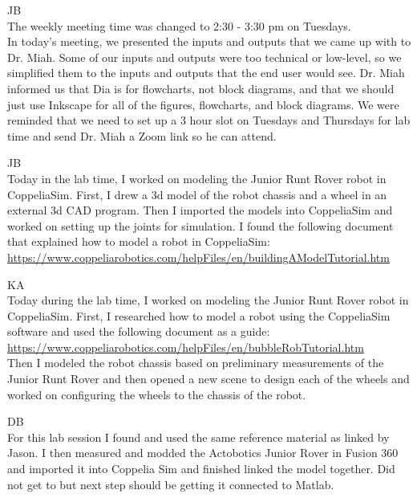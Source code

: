 \documentclass[fontsize=11pt, %
                             paper=letter, %
                             openany, %
                             captions=tableheading,
                             index=totoc,
                             hyperref]{labbook}
\begin{document}
\begin{addmargin}[0cm]{0cm}
JB\\
The weekly meeting time was changed to 2:30 - 3:30 pm on Tuesdays.\\
In today's meeting, we presented the inputs and outputs that we came up with to Dr. Miah. Some of our inputs and outputs were too technical or low-level, so we simplified them to the inputs and outputs that the end user would see. Dr. Miah informed us that Dia is for flowcharts, not block diagrams, and that we should just use Inkscape for all of the figures, flowcharts, and block diagrams. We were reminded that we need to set up a 3 hour slot on Tuesdays and Thursdays for lab time and send Dr. Miah a Zoom link so he can attend.



JB\\
Today in the lab time, I worked on modeling the Junior Runt Rover robot in CoppeliaSim. First, I drew a 3d model of the robot chassis and a wheel in an external 3d CAD program. Then I imported the models into CoppeliaSim and worked on setting up the joints for simulation. I found the following document that explained how to model a robot in CoppeliaSim: \href{https://www.coppeliarobotics.com/helpFiles/en/buildingAModelTutorial.htm}{https://www.coppeliarobotics.com/helpFiles/en/buildingAModelTutorial.htm}

\vspace*{12pt}

KA\\
Today during the lab time, I worked on modeling the Junior Runt Rover robot in CoppeliaSim. First, I researched how to model a robot using the CoppeliaSim software and used the following document as a guide:\\
\href{https://www.coppeliarobotics.com/helpFiles/en/bubbleRobTutorial.htm}{https://www.coppeliarobotics.com/helpFiles/en/bubbleRobTutorial.htm}\\
Then I modeled the robot chassis based on preliminary measurements of the Junior Runt Rover and then opened a new scene to design each of the wheels and worked on configuring the wheels to the chassis of the robot.

\vspace*{12pt}DB\\
For this lab session I found and used the same reference material as linked by Jason.  I then measured and modded the Actobotics Junior Rover in Fusion 360 and imported it into Coppelia Sim and finished linked the model together.  Did not get to but next step should be getting it connected to Matlab.


\end{addmargin}
\end{document}
